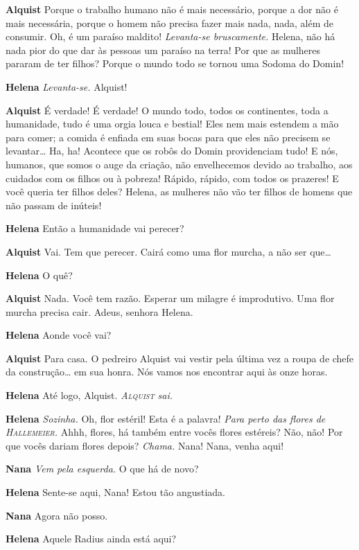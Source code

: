 \textbf{Alquist} Porque o trabalho humano não é mais necessário, porque a dor não é mais
necessária, porque o homem não precisa fazer mais nada, nada, além de
consumir. Oh, é um paraíso maldito! \emph{Levanta-se bruscamente.} Helena,
não há nada pior do que dar às pessoas um paraíso na terra! Por que as mulheres
pararam de ter filhos? Porque o mundo todo se tornou uma Sodoma do Domin!

\textbf{Helena} \emph{Levanta-se.} Alquist!

\textbf{Alquist} É verdade! É verdade! O mundo todo, todos os continentes, toda a
humanidade, tudo é uma orgia louca e bestial! Eles nem mais estendem a mão para
comer; a comida é enfiada em suas bocas para que eles não precisem se
levantar\ldots{} Ha, ha! Acontece que os robôs do Domin providenciam tudo! E nós,
humanos, que somos o auge da criação, não envelhecemos devido ao trabalho,
aos cuidados com os filhos ou à pobreza! Rápido, rápido, com todos os prazeres! E você
queria ter filhos deles? Helena, as mulheres não vão ter filhos de homens que
não passam de inúteis!

\textbf{Helena} Então a humanidade vai perecer?

\textbf{Alquist} Vai. Tem que perecer. Cairá como uma flor murcha, a não ser que\ldots{}

\textbf{Helena} O quê?

\textbf{Alquist} Nada. Você tem razão. Esperar um milagre é improdutivo. Uma flor murcha
precisa cair. Adeus, senhora Helena.

\textbf{Helena} Aonde você vai?

\textbf{Alquist} Para casa. O pedreiro Alquist vai vestir pela última vez a roupa
de chefe da construção\ldots{} em sua honra. Nós vamos nos encontrar aqui às onze
horas.

\textbf{Helena} Até logo, Alquist.
\emph{\textsc{Alquist} sai.}

\textbf{Helena} \emph{Sozinha.} Oh, flor estéril! Esta é a palavra! \emph{Para perto
das flores de \textsc{Hallemeier}.} Ahhh, flores, há também entre vocês flores estéreis?
Não, não! Por que vocês dariam flores depois? \emph{Chama.} Nana! Nana, venha
aqui!

\textbf{Nana} \emph{Vem pela esquerda.} O que há de novo?

\textbf{Helena} Sente-se aqui, Nana! Estou tão angustiada.

\textbf{Nana} Agora não posso.

\textbf{Helena} Aquele Radius ainda está aqui?

